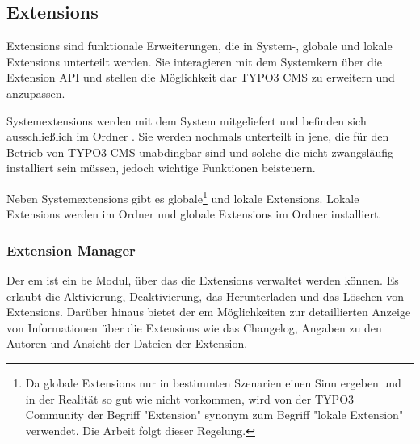 \subsection{Extensions}
Extensions sind funktionale Erweiterungen, die in System-, globale und lokale Extensions unterteilt werden. Sie interagieren mit dem Systemkern über die Extension API und stellen die Möglichkeit dar TYPO3 CMS zu erweitern und anzupassen.

Systemextensions werden mit dem System mitgeliefert und befinden sich ausschließlich im Ordner . Sie werden nochmals unterteilt in jene, die für den Betrieb von TYPO3 CMS unabdingbar sind und solche die nicht zwangsläufig installiert sein müssen, jedoch wichtige Funktionen beisteuern.

Neben Systemextensions gibt es globale\footnote{Da globale Extensions nur in bestimmten Szenarien einen Sinn ergeben und in der Realität so gut wie nicht vorkommen, wird von der TYPO3 Community der Begriff "Extension" synonym zum Begriff "lokale Extension" verwendet. Die Arbeit folgt dieser Regelung.} und lokale Extensions. Lokale Extensions werden im Ordner  und globale Extensions im Ordner  installiert.

\subsubsection{Extension Manager}
Der \gls{em} ist ein \gls{be} Modul, über das die Extensions verwaltet werden können. Es erlaubt die Aktivierung, Deaktivierung, das Herunterladen und das Löschen von Extensions. Darüber hinaus bietet der \gls{em} Möglichkeiten zur detaillierten Anzeige von Informationen über die Extensions wie das Changelog, Angaben zu den Autoren und Ansicht der Dateien der Extension.

